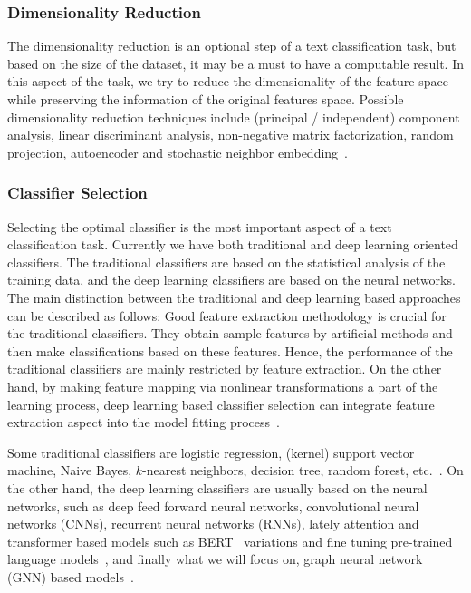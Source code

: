 \subsubsection{Dimensionality Reduction}
The dimensionality reduction is an optional step of a text classification task, but based on the size of the dataset, it may be a must to have a computable result. In this aspect of the task, we try to reduce the dimensionality of the feature space while preserving the information of the original features space. Possible dimensionality reduction techniques include (principal / independent) component analysis, linear discriminant analysis, non-negative matrix factorization, random projection, autoencoder and stochastic neighbor embedding~\autocite{kowsari19tc}.

\subsubsection{Classifier Selection}
Selecting the optimal classifier is the most important aspect of a text classification task. Currently we have both traditional and deep learning oriented classifiers. The traditional classifiers are based on the statistical analysis of the training data, and the deep learning classifiers are based on the neural networks. The main distinction between the traditional and deep learning based approaches can be described as follows: Good feature extraction methodology is crucial for the traditional classifiers. They obtain sample features by artificial methods and then make classifications based on these features. Hence, the performance of the traditional classifiers are mainly restricted by feature extraction. On the other hand, by making feature mapping via nonlinear transformations a part of the learning process, deep learning based classifier selection can integrate feature extraction aspect into the model fitting process~\autocite{li20tc}.

Some traditional classifiers are logistic regression, (kernel) support vector machine, Naive Bayes, \(k\)-nearest neighbors, decision tree, random forest, etc.~\autocite{li20tc,kowsari19tc}. On the other hand, the deep learning classifiers are usually based on the neural networks, such as deep feed forward neural networks, convolutional neural networks (CNNs), recurrent neural networks (RNNs), lately attention and transformer based models such as BERT~\autocite{devlin18bert} variations and fine tuning pre-trained language models~\autocite{howard18tc}, and finally what we will focus on, graph neural network (GNN) based models~\autocite{kowsari19tc,li20tc,minaee20tc}.

